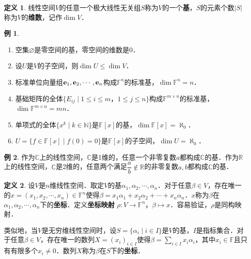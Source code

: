 \documentclass[a4paper,fontset=windows]{ctexbook}
\theoremstyle{definition}
\newtheorem{definition}{定义}[chapter]
\newtheorem{example}{例}[chapter]
\renewcommand{\le}{\leqslant}
\begin{document}
\begin{definition}
线性空间$V$的任意一个极大线性无关组$S$称为$V$的一个{\bf 基}，$S$的元素个数$|S|$称为$V$的{\bf 维数}，记作$\dim V$．
\end{definition}

\begin{example}~
\begin{enumerate}
\item 空集$\varnothing$是零空间的基，零空间的维数是0．

\item 设$U$是$V$的子空间，则$\dim U\le\dim V$．

\item 标准单位向量组${\bf e}_1,{\bf e}_2,\cdots,{\bf e}_n$构成$\mathbb{F}^n$的标准基，$\dim\mathbb{F}^n=n$．

\item 基础矩阵的全体$\{E_{ij}\mid 1\le i\le m$，$1\le j\le n\}$构成$\mathbb{F}^{m\times n}$的标准基，$\dim\mathbb{F}^{m\times n}=mn$．

\item 单项式的全体$\{x^k\mid k\in\mathbb{N}\}$是$\mathbb{F}[x]$的基，$\dim\mathbb{F}[x]=\aleph_0$．

\item $U=\{f\in\mathbb{F}[x]\mid f(0)=0\}$是$\mathbb{F}[x]$的子空间，$\dim U=\aleph_0$．
\end{enumerate}
\end{example}

\begin{example}
作为$\mathbb{C}$上的线性空间，$\mathbb{C}$是1维的，任意一个非零复数$a$都构成$\mathbb{C}$的基．作为$\mathbb{R}$上的线性空间，$\mathbb{C}$是2维的，任意两个满足$\dfrac{a}{b}\notin\mathbb{R}$的非零复数$a,b$都构成$\mathbb{C}$的基．
\end{example}

\begin{definition}
设$V$是$n$维线性空间．取定$V$的基$\alpha_1,\alpha_2,\cdots,\alpha_n$．对于任意$\beta\in V$，存在唯一的$x=(x_1,x_2,\cdots,x_n)\in\mathbb{F}^n$使得$\beta=x_1\alpha_1+x_2\alpha_2+\cdots+x_n\alpha_n$．$x$称为$\beta$在$\alpha_1,\alpha_2,\cdots,\alpha_n$下的{\bf 坐标}．定义{\bf 坐标映射} $\rho:V\to\mathbb{F}^n$，$\beta\mapsto x$．容易验证，$\rho$是同构映射．

类似地，当$V$是无穷维线性空间时，设$S=\{\alpha_i\mid i\in I\}$是$V$的基，$I$是指标集合．对于任意$\beta\in V$，存在唯一的数列$X=(x_i)_{i\in I}$使得$\beta=\sum\limits_{i\in I}x_i\alpha_i$，其中$x_i\in\mathbb{F}$且只有有限多个$x_i\ne 0$．数列$X$称为$\beta$在$S$下的{\bf 坐标}．
\end{definition}
\end{document}
